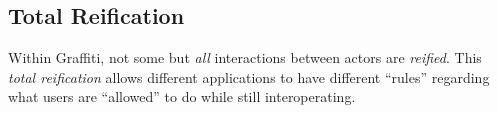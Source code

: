 

\subsection{Total Reification}
\label{concepts:total-reification}

Within Graffiti, not some but \emph{all} interactions between actors
are \emph{reified}.
This \emph{total reification} allows different applications to have
different ``rules'' regarding what users are ``allowed'' to do while
still interoperating.



